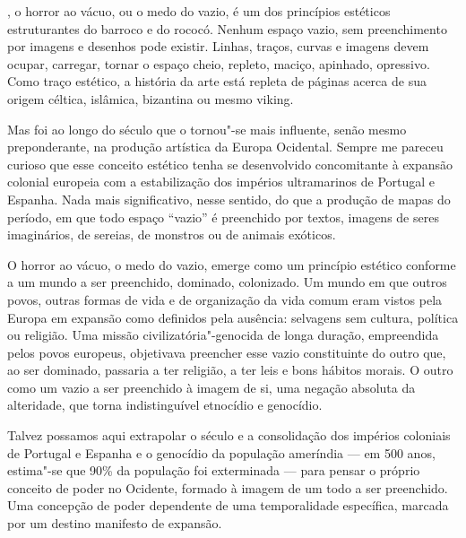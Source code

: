 \begin{multicols}{2}
{}, o horror ao vácuo, ou o medo do vazio, é um dos
princípios estéticos estruturantes do barroco e do rococó. Nenhum espaço
vazio, sem preenchimento por imagens e desenhos pode existir. Linhas,
traços, curvas e imagens devem ocupar, carregar, tornar o espaço cheio,
repleto, maciço, apinhado, opressivo. Como traço estético, a história da
arte está repleta de páginas acerca de sua origem céltica, islâmica,
bizantina ou mesmo viking.

\bigskip

{\small{}}

\bigskip

Mas foi ao longo do século  que o {} tornou"-se mais
influente, senão mesmo preponderante, na produção artística da Europa
Ocidental. Sempre me pareceu curioso que esse conceito estético tenha se
desenvolvido concomitante à expansão colonial europeia com a
estabilização dos impérios ultramarinos de Portugal e Espanha. Nada mais
significativo, nesse sentido, do que a produção de mapas do período, em
que todo espaço ``vazio'' é preenchido por textos, imagens de seres
imaginários, de sereias, de monstros ou de animais exóticos.

O horror ao vácuo, o medo do vazio, emerge como um princípio estético
conforme a um mundo a ser preenchido, dominado, colonizado. Um mundo em
que outros povos, outras formas de vida e de organização da vida comum
eram vistos pela Europa em expansão como definidos pela ausência:
selvagens sem cultura, política ou religião. Uma missão
civilizatória"-genocida de longa duração, empreendida pelos povos
europeus, objetivava preencher esse vazio constituinte do outro que, ao
ser dominado, passaria a ter religião, a ter leis e bons hábitos morais.
O outro como um vazio a ser preenchido à imagem de si, uma negação
absoluta da alteridade, que torna indistinguível etnocídio e genocídio.

Talvez possamos aqui extrapolar o século  e a consolidação dos
impérios coloniais de Portugal e Espanha e o genocídio da população
ameríndia --- em 500 anos, estima"-se que 90\% da população foi exterminada
--- para pensar o próprio conceito de poder no Ocidente, formado à imagem
de um todo a ser preenchido. Uma concepção de poder dependente de uma
temporalidade específica, marcada por um destino manifesto de expansão.


\end{multicols}
